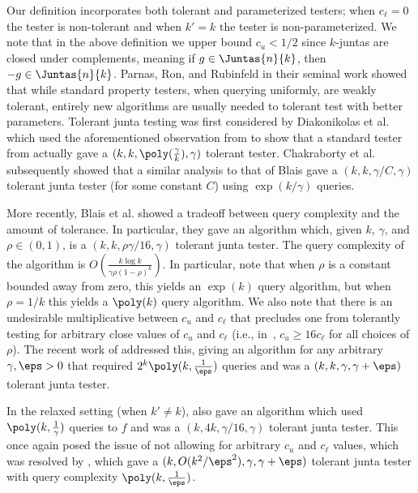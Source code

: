 Our definition incorporates both tolerant and parameterized testers; when $c_\ell = 0$ the tester is non-tolerant and when $k' = k$ the tester is non-parameterized. We note that in the above definition we upper bound $c_u<1/2$ since $k$-juntas are closed under complements, meaning if $g \in \Juntas{n}{k}$, then $-g \in \Juntas{n}{k}$. Parnas, Ron, and Rubinfeld in their seminal work \cite{og-tolerant}  showed that while standard property testers, when querying uniformly, are weakly tolerant, entirely new algorithms are usually needed to tolerant test with better parameters. Tolerant junta testing was first considered by Diakonikolas et al. \cite{DBLP:conf/focs/DiakonikolasLMORSW07} which used the aforementioned observation from \cite{og-tolerant} to show that a standard tester from \cite{FischerKRSS04} actually gave a $(k, k, \poly(\frac{\gamma}{k}), \gamma)$ tolerant tester. Chakraborty et al. \cite{DBLP:conf/coco/ChakrabortyFGM12} subsequently showed that a similar analysis to that of Blais \cite{og-junta-testing} gave a $(k, k, \gamma/C, \gamma)$ tolerant junta tester (for some constant $C$) using $\exp(k/\gamma)$ queries.

More recently, Blais et al. \cite[Theorem 1.2]{junta-submodular-opt} showed a tradeoff between query complexity and the amount of tolerance. In particular, they gave an algorithm which, given $k$, $\gamma$, and $\rho\in(0,1)$, is a $(k, k, \rho\gamma/16, \gamma)$ tolerant junta tester. The query complexity of the algorithm is $O\!\left(\frac{k\log k}{\gamma \rho (1-\rho)^k}\right )$. In particular, note that when $\rho$ is a constant bounded away from zero, this yields an $\exp(k)$ query algorithm, but when $\rho = 1/k$ this yields a $\poly(k)$ query algorithm. We also note that there is  an undesirable multiplicative  between $c_u$ and $c_\ell$ that precludes one from tolerantly testing for arbitrary close values of $c_u$ and $c_\ell$ (i.e., in~\cite{junta-submodular-opt},  $c_u \ge 16 c_{\ell}$ for all choices of $\rho$). 
The recent work of \cite{junta-coordinate-oracles} addressed this, giving an algorithm for any arbitrary $\gamma, \eps>0$ that required $2^k\poly(k,\frac{1}{\eps})$ queries and was a $(k, k, \gamma, \gamma+\eps)$ tolerant junta tester.

In the relaxed setting (when $k' \neq k$), \cite[Theorem 1.1]{junta-submodular-opt} also gave an algorithm which used $\poly(k, \frac{1}{\gamma})$ queries to $f$ and was a $(k, 4k, \gamma/16, \gamma)$ tolerant junta tester. This once again posed the issue of not allowing for arbitrary $c_u$ and $c_\ell$ values, which was resolved by \cite[Corollary 1.6]{junta-coordinate-oracles}, which gave a $(k, O(k^2/\eps^2), \gamma, \gamma+\eps)$ tolerant junta tester with query complexity $\poly(k, \frac{1}{\eps})$. 

